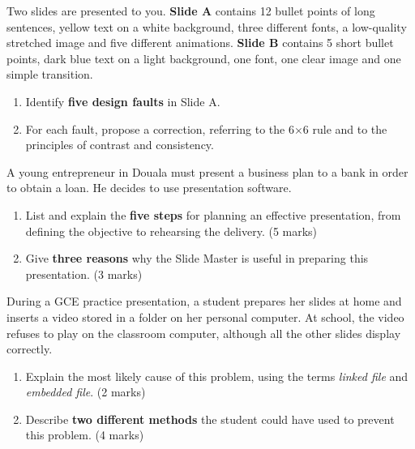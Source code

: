 \documentclass[11pt]{article}
\newcounter{popsec}
\newcounter{popsub}
\newcommand{\courssub}[1]{%
  \stepcounter{popsub}%
  \par\vspace{9pt}\noindent{\popxbold\fontsize{11.5}{13}\selectfont\color{popink}{\color{poporange}\thepopsec.\thepopsub}\hspace{6pt}#1}\par\nopagebreak\vspace{4pt}
}
\begin{document}
\begin{exercice}
Two slides are presented to you. \textbf{Slide A} contains 12 bullet points of long sentences, yellow text on a white background, three different fonts, a low-quality stretched image and five different animations. \textbf{Slide B} contains 5 short bullet points, dark blue text on a light background, one font, one clear image and one simple transition.
\begin{enumerate}
\item Identify \textbf{five design faults} in Slide A.
\item For each fault, propose a correction, referring to the 6$\times$6 rule and to the principles of contrast and consistency.
\end{enumerate}
\end{exercice}

\courssub{I prepare for the GCE}

\begin{exercice}
A young entrepreneur in Douala must present a business plan to a bank in order to obtain a loan. He decides to use presentation software.
\begin{enumerate}
\item List and explain the \textbf{five steps} for planning an effective presentation, from defining the objective to rehearsing the delivery. \hfill (5 marks)
\item Give \textbf{three reasons} why the Slide Master is useful in preparing this presentation. \hfill (3 marks)
\end{enumerate}
\end{exercice}

\begin{exercice}
During a GCE practice presentation, a student prepares her slides at home and inserts a video stored in a folder on her personal computer. At school, the video refuses to play on the classroom computer, although all the other slides display correctly.
\begin{enumerate}
\item Explain the most likely cause of this problem, using the terms \emph{linked file} and \emph{embedded file}. \hfill (2 marks)
\item Describe \textbf{two different methods} the student could have used to prevent this problem. \hfill (4 marks)
\end{enumerate}
\end{exercice}
\end{document}
